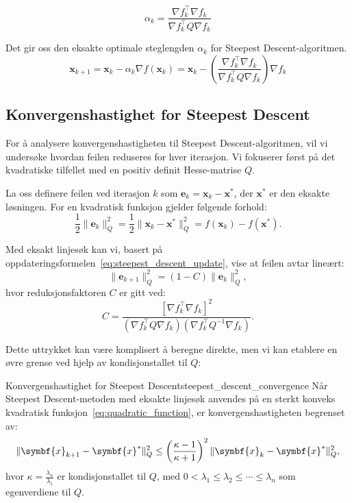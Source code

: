 \[
	\alpha_k = \frac{\nabla f_k^\top \nabla f_k}{\nabla f_k^\top Q \nabla f_k}
\]

Det gir oss den eksakte optimale steglengden \(\alpha_k\) for Steepest Descent-algoritmen.
\begin{equation*}
	\symbf{x}_{k+1} = \symbf{x}_k - \alpha_k \nabla f(\symbf{x}_k) = \symbf{x}_k - \left(\frac{\nabla f_k^\top \nabla f_k}{\nabla f_k^\top Q \nabla f_k}\right) \nabla f_k
\end{equation*}\label{eq:steepest_descent_update}
\subsection{Konvergenshastighet for Steepest Descent}
For å analysere konvergenshastigheten til Steepest Descent-algoritmen, vil vi undersøke hvordan feilen reduseres for hver iterasjon. Vi fokuserer først på det kvadratiske tilfellet med en positiv definit Hesse-matrise $Q$.

La oss definere feilen ved iterasjon $k$ som $\symbf{e}_k = \symbf{x}_k - \symbf{x}^\ast$, der $\symbf{x}^\ast$ er den eksakte løsningen. For en kvadratisk funksjon gjelder følgende forhold:
\[
	\frac{1}{2} \|\symbf{e}_k\|_Q^2 = \frac{1}{2} \|\symbf{x}_k - \symbf{x}^\ast\|_Q^2 = f(\symbf{x}_k) - f(\symbf{x}^\ast).
\]

Med eksakt linjesøk kan vi, basert på oppdateringsformelen~\eqref{eq:steepest_descent_update}, vise at feilen avtar lineært:
\[
	\|\symbf{e}_{k+1}\|_Q^2 = (1 - C) \|\symbf{e}_k\|_Q^2,
\]
hvor reduksjonsfaktoren $C$ er gitt ved:
\[
	C = \frac{[\nabla f_k^\top \nabla f_k]^2}{(\nabla f_k^\top Q \nabla f_k)(\nabla f_k^\top Q^{-1} \nabla f_k)}.
\]

Dette uttrykket kan være komplisert å beregne direkte, men vi kan etablere en øvre grense ved hjelp av kondisjonstallet til $Q$:

\begin{theorem}{Konvergenshastighet for Steepest Descent}{steepest_descent_convergence}
	Når Steepest Descent-metoden med eksakte linjesøk anvendes på en sterkt konveks kvadratisk funksjon~\eqref{eq:quadratic_function}, er konvergenshastigheten begrenset av:
	\[
		\norm{\symbf{x}_{k+1} - \symbf{x}^\ast}_Q^2 \leq \left(\frac{\kappa - 1}{\kappa + 1}\right)^2 \norm{\symbf{x}_k - \symbf{x}^\ast}_Q^2,
	\]
	hvor $\kappa = \frac{\lambda_n}{\lambda_1}$ er kondisjonstallet til $Q$, med $0 < \lambda_1 \leq \lambda_2 \leq \cdots \leq \lambda_n$ som egenverdiene til $Q$.
\end{theorem}


